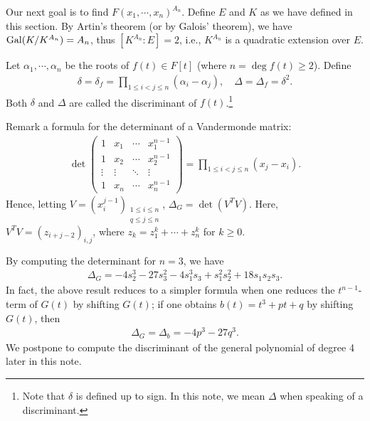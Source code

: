 Our next goal is to find $F(x_1, \cdots, x_n)^{A_n}$.
Define $E$ and $K$ as we have defined in this section.
By Artin's theorem (or by Galois' theorem), we have ${\textrm{Gal}({K/K^{A_n}})}=A_n$, thus $[K^{A_n}: E]=2$, i.e., $K^{A_n}$ is a quadratic extension over $E$.

\begin{defi}[Discriminant]
    Let $\alpha_1, \cdots, \alpha_n$ be the roots of $f(t)\in F[t]$ (where $n=\deg f(t)\geq 2$).
    Define
    \begin{align*}
        \delta=\delta_f=\prod_{1\leq i<j\leq n}(\alpha_i-\alpha_j),\quad\Delta=\Delta_f=\delta^2.
    \end{align*}
    Both $\delta$ and $\Delta$ are called the discriminant of $f(t)$.\footnote{Note that $\delta$ is defined up to sign. In this note, we mean $\Delta$ when speaking of a discriminant.}
\end{defi}
\begin{obs}
    Remark a formula for the determinant of a Vandermonde matrix:
    \begin{align*}
        \det\begin{pmatrix}
                1   &   x_1 &   \cdots  &   x_1^{n-1}\\
                1   &   x_2 &   \cdots  &   x_2^{n-1}\\
            \vdots  &\vdots &   \ddots  &   \vdots   \\
                1   &   x_n &   \cdots  &   x_n^{n-1}
        \end{pmatrix}
        =\prod_{1\leq i<j\leq n}(x_j-x_i).
    \end{align*}
    Hence, letting $V=(x_i^{j-1})_{\substack{1\leq i\leq n\\q\leq j\leq n}}$, $\Delta_G=\det(V^T V)$.
    Here, $V^T V=(z_{i+j-2})_{i, j}$, where $z_k=z_1^k+\cdots+z_n^k$ for $k\geq 0$.

    By computing the determinant for $n=3$, we have
    \begin{align*}
        \Delta_G=-4s_2^3-27s_3^2-4s_1^3s_3+s_1^2s_2^2+18s_1s_2s_3.
    \end{align*}
    In fact, the above result reduces to a simpler formula when one reduces the $t^{n-1}$-term of $G(t)$ by shifting $G(t)$; if one obtains $b(t)=t^3+pt+q$ by shifting $G(t)$, then
    \begin{align*}
        \Delta_G=\Delta_b=-4p^3-27q^3.
    \end{align*}
    We postpone to compute the discriminant of the general polynomial of degree 4 later in this note.
\end{obs}

